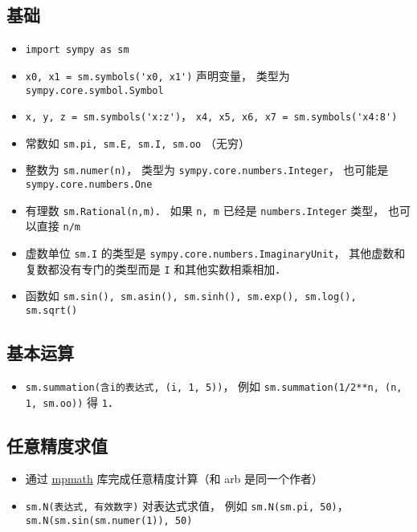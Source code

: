 
\begin{issues}
\issueDraft
\end{issues}


\subsection{基础}
\begin{itemize}
\item \verb|import sympy as sm|
\item \verb|x0, x1 = sm.symbols('x0, x1')| 声明变量， 类型为 \verb|sympy.core.symbol.Symbol|
\item \verb|x, y, z = sm.symbols('x:z')|， \verb|x4, x5, x6, x7 = sm.symbols('x4:8')|
\item 常数如 \verb|sm.pi, sm.E, sm.I, sm.oo| （无穷）
\item 整数为 \verb|sm.numer(n)|， 类型为 \verb|sympy.core.numbers.Integer|， 也可能是 \verb|sympy.core.numbers.One|
\item 有理数 \verb|sm.Rational(n,m)|． 如果 \verb|n, m| 已经是 \verb|numbers.Integer| 类型， 也可以直接 \verb|n/m|
\item 虚数单位 \verb|sm.I| 的类型是 \verb|sympy.core.numbers.ImaginaryUnit|， 其他虚数和复数都没有专门的类型而是 \verb|I| 和其他实数相乘相加．
\item 函数如 \verb|sm.sin(), sm.asin(), sm.sinh(), sm.exp(), sm.log(), sm.sqrt()|
\end{itemize}

\subsection{基本运算}
\begin{itemize}
\item \verb|sm.summation(含i的表达式, (i, 1, 5))|， 例如 \verb|sm.summation(1/2**n, (n, 1, sm.oo))| 得 \verb|1|．
\end{itemize}

\subsection{任意精度求值}
\begin{itemize}
\item 通过 \href{https://mpmath.org/}{mpmath} 库完成任意精度计算（和 arb 是同一个作者）
\item \verb|sm.N(表达式, 有效数字)| 对表达式求值， 例如 \verb|sm.N(sm.pi, 50)|， \verb|sm.N(sm.sin(sm.numer(1)), 50)|
\end{itemize}

